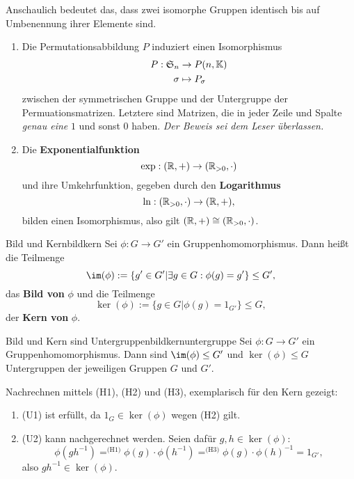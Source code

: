 \begin{bemerkung}
Anschaulich bedeutet das, dass zwei isomorphe Gruppen identisch bis auf Umbenennung ihrer Elemente sind.
\end{bemerkung}
\begin{beispiele}
\begin{enumerate}
\item Die Permutationsabbildung $P$ induziert einen Isomorphismus
\begin{align}
P: \mathfrak{S}_n &\to P(n, \mathbb{K})\\
\sigma &\mapsto P_\sigma
\end{align}
zwischen der symmetrischen Gruppe und der Untergruppe der Permuationsmatrizen. Letztere sind Matrizen, die in jeder Zeile und Spalte \textit{genau eine} $1$ und sonst $0$ haben. \textit{Der Beweis sei dem Leser überlassen.}
\item Die \textbf{Exponentialfunktion}
\begin{equation}
\exp: (\mathbb{R}, +) \to (\mathbb{R}_{> 0}, \cdot)
\end{equation}
und ihre Umkehrfunktion, gegeben durch den \textbf{Logarithmus}
\begin{equation}
\ln: (\mathbb{R}_{>0}, \cdot) \to (\mathbb{R}, +),
\end{equation}
bilden einen Isomorphismus, also gilt $(\mathbb{R}, +) \cong (\mathbb{R}_{>0}, \cdot)$.
\end{enumerate}
\end{beispiele}
\begin{definition}{Bild und Kern}{bildkern}
Sei $\phi: G \to G'$ ein Gruppenhomomorphismus. Dann heißt die Teilmenge
\begin{equation}
\im (\phi) := \{g' \in G' | \exists g \in G: \phi(g) = g'\} \leq G',
\end{equation}
das \textbf{Bild von} $\phi$ und die Teilmenge
\begin{equation}
\ker (\phi) := \{g \in G|\phi(g) = 1_{G'} \} \leq G,
\end{equation}
der \textbf{Kern von} $\phi$.
\end{definition}
\begin{satz}{Bild und Kern sind Untergruppen}{bildkernuntergruppe}
Sei $\phi: G \to G'$ ein Gruppenhomomorphismus. Dann sind $\im (\phi) \leq G'$ und $\ker (\phi) \leq G$ Untergruppen der jeweiligen Gruppen $G$ und $G'$.
\end{satz}
\begin{beweis}
Nachrechnen mittels (H1), (H2) und (H3), exemplarisch für den Kern gezeigt:
\begin{enumerate}
\item (U1) ist erfüllt, da $1_G \in \ker (\phi)$ wegen (H2) gilt.
\item (U2) kann nachgerechnet werden. Seien dafür $g,h \in \ker (\phi)$:
\begin{equation}
\phi(gh^{-1}) =^{\text{(H1)}} \phi(g) \cdot \phi(h^{-1}) =^{\text{(H3)}} \phi(g) \cdot \phi(h)^{-1} = 1_{G'},
\end{equation}
also $gh^{-1} \in \ker (\phi)$.
\end{enumerate}
\end{beweis}
